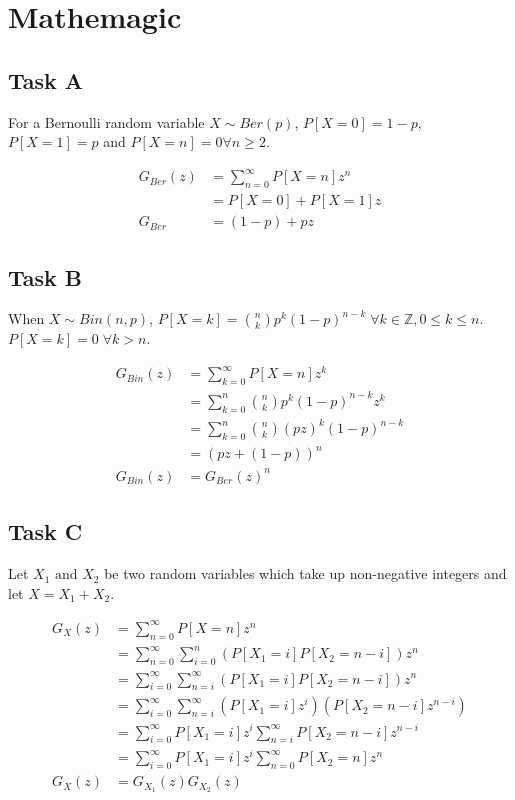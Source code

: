\section{Mathemagic}

\subsection{Task A}

For a Bernoulli random variable $X \sim Ber(p)$, $P[X = 0] = 1-p$, $P[X = 1] = p$ and $P[X = n] = 0 \forall n \geq 2$.

\begin{align*}
    G_{Ber}(z) &= \sum_{n=0}^{\infty} P[X = n]z^n \\
    &= P[X=0] + P[X=1]z \\
    G_{Ber} &= (1-p) + pz
\end{align*}

\subsection{Task B}

When $X \sim Bin(n, p)$, $P[X=k] = \binom{n}{k} p^k (1-p)^{n-k} \; \forall k \in \mathbb{Z}, 0 \leq k \leq n$. $P[X=k] = 0 \; \forall k > n$.

\begin{align*}
    G_{Bin}(z) &= \sum_{k=0}^{\infty} P[X = n] z^k \\
    &= \sum_{k=0}^{n} \binom{n}{k} p^k (1-p)^{n-k} z^k \\
    &= \sum_{k=0}^{n} \binom{n}{k} (pz)^k (1-p)^{n-k} \\
    &= (pz + (1-p))^n \\
    G_{Bin}(z) &= G_{Ber}(z)^n
\end{align*}

\subsection{Task C}


Let $X_1 \text{ and } X_2$ be two random variables which take up non-negative integers and let $X = X_1 + X_2$.

\begin{align*}
    G_X(z) &= \sum_{n=0}^{\infty} P[X = n] z^n \\
    &= \sum_{n=0}^{\infty} \sum_{i=0}^{n} (P[X_1=i]P[X_2=n-i])z^n \\
    &= \sum_{i=0}^{\infty} \sum_{n=i}^{\infty} (P[X_1=i]P[X_2=n-i])z^n \\
    &= \sum_{i=0}^{\infty} \sum_{n=i}^{\infty} (P[X_1=i]z^i)(P[X_2=n-i]z^{n-i}) \\
    &= \sum_{i=0}^{\infty} P[X_1=i]z^i \sum_{n=i}^{\infty} P[X_2=n-i]z^{n-i} \\
    &= \sum_{i=0}^{\infty} P[X_1=i]z^i \sum_{n=0}^{\infty} P[X_2=n]z^{n} \\
    G_X(z)&= G_{X_1}(z) G_{X_2}(z)
\end{align*}

